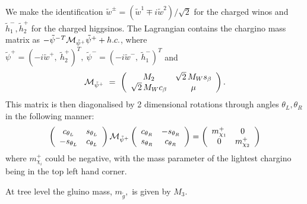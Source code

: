 \documentclass{article}
\begin{document}
We make the identification
${\tilde w}^\pm = ({\tilde w^1} \mp i{\tilde w^2} ) / \sqrt{2}$ for the charged
winos and ${\tilde h_1^-}, {\tilde h_2^+}$ for the charged higgsinos.
The Lagrangian contains the chargino mass matrix as
$-{\tilde\psi^-}{}^T{\cal M}_{\tilde\psi^+}\tilde\psi^+ + h.c.$,
where~$\tilde\psi^+ = (-i\tilde w^+,\ \tilde h_2^+)^T,\ \tilde\psi^-=
(-i\tilde w^-,\ \tilde h_1^-)^T$ and
%
\begin{equation}
{\cal M}_{\tilde\psi^+}\ =\ \left( \begin{array}{cc} M_2 &
\sqrt2\,M_Ws_\beta\\\sqrt2\,M_Wc_\beta & \mu\end{array}\right).
\label{mchi}
\end{equation}
%
This matrix is then diagonalised by 2 dimensional rotations through angles
$\theta_L, \theta_R$ in the following manner:
\begin{equation}
\left( \begin{array}{cc} 
c_{\theta_L} & s_{\theta_L} \\
-s_{\theta_L} & c_{\theta_L} \\
\end{array} \right)
{\cal M}_{\tilde\psi^+}
\left( \begin{array}{cc} 
c_{\theta_R} & -s_{\theta_R} \\
s_{\theta_R} & c_{\theta_R} \\
\end{array} \right) =
\left( \begin{array}{cc}
m_{\chi_1}^+ & 0 \\
0 & m_{\chi_2}^+
\end{array}
\right)
\end{equation}
where $m_{\chi_i}^+$ could be negative,
with the mass parameter of the lightest chargino being in the top left hand
corner. 

At tree level the gluino mass, $m_{\tilde g},$ is given by $M_3$.
\end{document}
